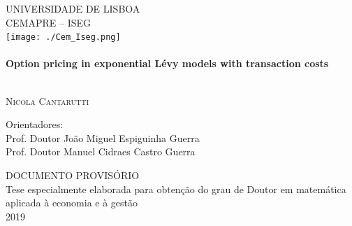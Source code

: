 \begin{titlepage}
\begin{center}



\textsc{\Large UNIVERSIDADE DE LISBOA}\\[0.5cm]
\textsc{\Large CEMAPRE -- ISEG}\\[1cm]

\texttt{[image: ./Cem\_Iseg.png]}~\\[1cm]

\HRule \\[0.4cm]
{ \huge \bfseries Option pricing in exponential Lévy models with transaction costs \\[0.4cm] }

\HRule \\[1.5cm]


\textsc{\LARGE Nicola Cantarutti}\\[1.5cm]


\noindent
\begin{flushleft} \large
Orientadores:\\[0.2cm]
Prof. Doutor João Miguel Espiguinha Guerra\\
Prof. Doutor Manuel Cidraes Castro Guerra\\
\end{flushleft}


\vfill

\textsc{\Large DOCUMENTO PROVISÓRIO}\\[0.4cm]
{Tese especialmente elaborada para obtenção do grau de Doutor em matemática aplicada à economia e à gestão}\\[2cm]

{\large 2019}\\[0.3cm]

\end{center}
\end{titlepage}